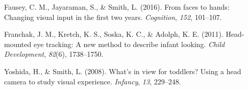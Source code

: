 \documentclass[10pt, letterpaper]{article}
\begin{document}
\hypertarget{ref-fausey2016}{}
Fausey, C. M., Jayaraman, S., \& Smith, L. (2016). From faces to hands:
Changing visual input in the first two years. \emph{Cognition},
\emph{152}, 101--107.

\hypertarget{ref-franchak2011}{}
Franchak, J. M., Kretch, K. S., Soska, K. C., \& Adolph, K. E. (2011).
Head-mounted eye tracking: A new method to describe infant looking.
\emph{Child Development}, \emph{82}(6), 1738--1750.

\hypertarget{ref-yoshida2008}{}
Yoshida, H., \& Smith, L. (2008). What's in view for toddlers? Using a
head camera to study visual experience. \emph{Infancy}, \emph{13},
229--248.


\end{document}
